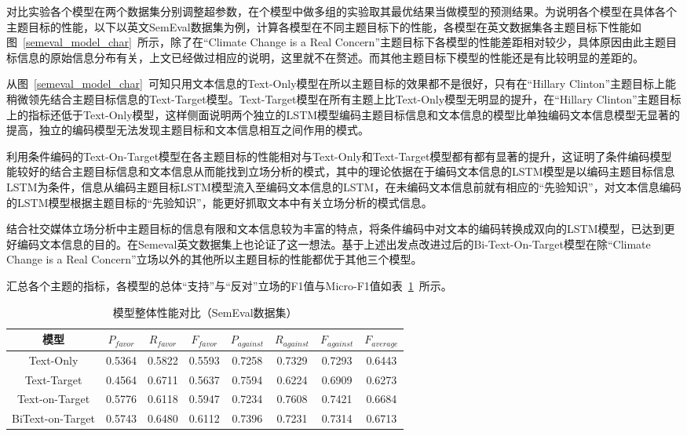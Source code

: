 对比实验各个模型在两个数据集分别调整超参数，在个模型中做多组的实验取其最优结果当做模型的预测结果。为说明各个模型在具体各个主题目标的性能，以下以英文SemEval数据集为例，计算各模型在不同主题目标下的性能，各模型在英文数据集各主题目标下性能如图~\ref{semeval_model_char}~所示，除了在“Climate Change is a Real Concern”主题目标下各模型的性能差距相对较少，具体原因由此主题目标信息的原始信息分布有关，上文已经做过相应的说明，这里就不在赘述。而其他主题目标下模型的性能还是有比较明显的差距的。

从图~\ref{semeval_model_char}~可知只用文本信息的Text-Only模型在所以主题目标的效果都不是很好，只有在“Hillary Clinton”主题目标上能稍微领先结合主题目标信息的Text-Target模型。Text-Target模型在所有主题上比Text-Only模型无明显的提升，在“Hillary Clinton”主题目标上的指标还低于Text-Only模型，这样侧面说明两个独立的LSTM模型编码主题目标信息和文本信息的模型比单独编码文本信息模型无显著的提高，独立的编码模型无法发现主题目标和文本信息相互之间作用的模式。

利用条件编码的Text-On-Target模型在各主题目标的性能相对与Text-Only和Text-Target模型都有都有显著的提升，这证明了条件编码模型能较好的结合主题目标信息和文本信息从而能找到立场分析的模式，其中的理论依据在于编码文本信息的LSTM模型是以编码主题目标信息LSTM为条件，信息从编码主题目标LSTM模型流入至编码文本信息的LSTM，在未编码文本信息前就有相应的“先验知识”，对文本信息编码的LSTM模型根据主题目标的“先验知识”，能更好抓取文本中有关立场分析的模式信息。

结合社交媒体立场分析中主题目标的信息有限和文本信息较为丰富的特点，将条件编码中对文本的编码转换成双向的LSTM模型，已达到更好编码文本信息的目的。在Semeval英文数据集上也论证了这一想法。基于上述出发点改进过后的Bi-Text-On-Target模型在除“Climate Change is a Real Concern”立场以外的其他所以主题目标的性能都优于其他三个模型。


汇总各个主题的指标，各模型的总体“支持”与“反对”立场的F1值与Micro-F1值如表~\ref{semeval_all_model}~所示。
\begin{table}[htbp]
	\caption[table123]{模型整体性能对比（SemEval数据集）}
	\label{semeval_all_model}
	\vspace{0.5em}\centering\wuhao
	\begin{tabular}{cccccccc}
		\toprule[1.5pt]
		模型& $P_{favor}$&$R_{favor}$&$F_{favor}$&$P_{against}$&$R_{against}$&$F_{against}$&$F_{average}$ \\
		\midrule[1pt]
		Text-Only&0.5364&0.5822&0.5593&0.7258&0.7329&0.7293&0.6443\\
		Text-Target&0.4564&0.6711&0.5637&0.7594&0.6224&0.6909&0.6273\\
		Text-on-Target&0.5776&0.6118&0.5947&0.7234&0.7608&0.7421&0.6684\\
		BiText-on-Target&0.5743&0.6480&0.6112&0.7396&0.7231&0.7314&0.6713\\
		\bottomrule[1.5pt]
	\end{tabular}
\end{table}

